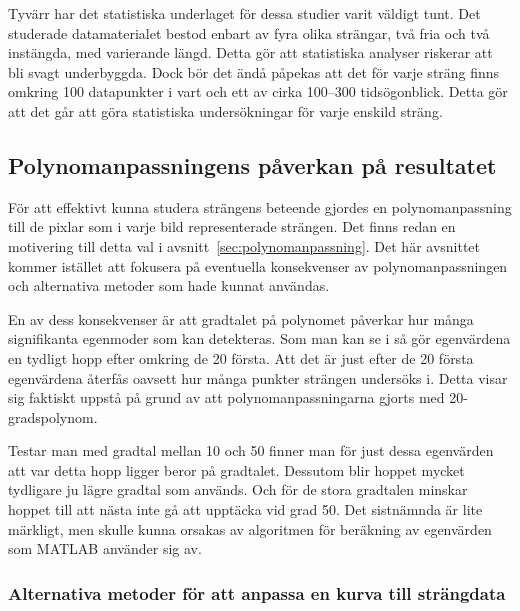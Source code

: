 Tyvärr har det statistiska underlaget för dessa studier varit väldigt tunt. Det studerade datamaterialet bestod enbart av fyra olika strängar, två fria och två instängda, med varierande längd. Detta gör att statistiska analyser riskerar att bli svagt underbyggda.
Dock bör det ändå påpekas att det för varje sträng finns omkring 100 datapunkter i vart och ett av cirka 100--300 tidsögonblick. Detta gör att det går att göra statistiska undersökningar för varje enskild sträng.


\subsection{Polynomanpassningens påverkan på resultatet}

För att effektivt kunna studera strängens beteende gjordes en polynomanpassning till de pixlar som i varje bild representerade strängen. Det finns redan en motivering till detta val i avsnitt~\ref{sec:polynomanpassning}. Det här avsnittet kommer istället att fokusera på eventuella konsekvenser av polynomanpassningen och alternativa metoder som hade kunnat användas. 

En av dess konsekvenser är att gradtalet på polynomet påverkar hur många signifikanta egenmoder som kan detekteras. Som man kan se i  så gör egenvärdena en tydligt hopp efter omkring de 20 första. Att det är just efter de 20 första egenvärdena återfås oavsett hur många punkter strängen undersöks i. 
Detta visar sig faktiskt uppstå på grund av att polynomanpassningarna gjorts med 20-gradspolynom. 

Testar man med gradtal mellan 10 och 50 finner man för just dessa egenvärden att var detta hopp ligger beror på gradtalet. Dessutom blir hoppet mycket tydligare ju lägre gradtal som används. Och för de stora gradtalen minskar hoppet till att nästa inte gå att upptäcka vid grad 50. Det sistnämnda är lite märkligt, men skulle kunna orsakas av algoritmen för beräkning av egenvärden som MATLAB använder sig av.


\subsubsection{Alternativa metoder för att anpassa en kurva till strängdata}


